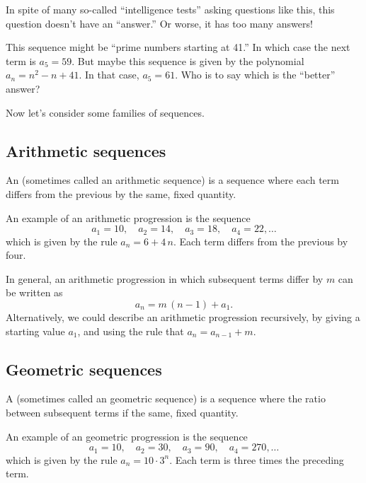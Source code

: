 \begin{solution}
In spite of many so-called ``intelligence tests'' asking questions like this, this question doesn't have an ``answer.''  Or worse, it has too many answers!

This sequence might be ``prime numbers starting at 41.''  In which case the next term is $a_5 =59$.  But maybe this sequence is given by the polynomial $a_n = n^2 - n + 41$.  In that case, $a_5 = 61$.  Who is to say which is the ``better'' answer?
\end{solution}

Now let's consider some families of sequences.

\subsection{Arithmetic sequences}

\begin{definition}
  An  (sometimes called an arithmetic
  sequence) is a sequence where each
  term differs from the previous by the same, fixed quantity.
\end{definition}

\begin{example}
  An example of an arithmetic progression is the sequence
  $$
  a_1 = 10, \quad a_2 = 14, \quad a_3 = 18, \quad a_4 = 22, \ldots
  $$
  which is given by the rule $a_n = 6 + 4 \, n$.  Each term differs
  from the previous by four.
\end{example}

In general, an arithmetic progression in which subsequent terms differ
by $m$ can be written as
$$
a_n = m \, (n-1) + a_1.
$$
Alternatively, we could describe an arithmetic progression
recursively, by giving a starting value $a_1$, and using the rule that
$a_{n} = a_{n-1} + m$.

\subsection{Geometric sequences}

\begin{definition}
  A  (sometimes called an geometric
  sequence) is a sequence where the ratio
  between subsequent terms if the same, fixed quantity.
\end{definition}

\begin{example}
  An example of an geometric progression is the sequence
  $$
  a_1 = 10, \quad a_2 = 30, \quad a_3 = 90, \quad a_4 = 270, \ldots
  $$
  which is given by the rule $a_n = 10 \cdot 3^n$.  Each term is three
  times the preceding term.
\end{example}

